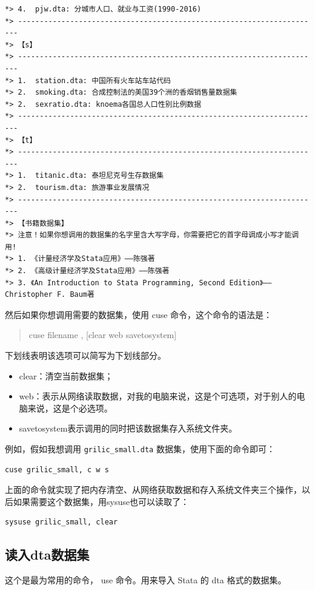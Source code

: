 \begin{lstlisting}
*> 4.  pjw.dta: 分城市人口、就业与工资(1990-2016)
*> ----------------------------------------------------------------------
*> 【s】
*> ----------------------------------------------------------------------
*> 1.  station.dta: 中国所有火车站车站代码
*> 2.  smoking.dta: 合成控制法的美国39个洲的香烟销售量数据集
*> 2.  sexratio.dta: knoema各国总人口性别比例数据
*> ----------------------------------------------------------------------
*> 【t】
*> ----------------------------------------------------------------------
*> 1.  titanic.dta: 泰坦尼克号生存数据集
*> 2.  tourism.dta: 旅游事业发展情况
*> ----------------------------------------------------------------------
*> 【书籍数据集】
*> 注意！如果你想调用的数据集的名字里含大写字母，你需要把它的首字母调成小写才能调用!
*> 1. 《计量经济学及Stata应用》——陈强著
*> 2. 《高级计量经济学及Stata应用》——陈强著
*> 3. 《An Introduction to Stata Programming, Second Edition》——Christopher F. Baum著
\end{lstlisting}

然后如果你想调用需要的数据集，使用 cuse 命令，这个命令的语法是：

\begin{quote}
cuse filename , {[}clear web savetosystem{]}
\end{quote}

下划线表明该选项可以简写为下划线部分。

\begin{itemize}
\item  clear：清空当前数据集；
\item  web：表示从网络读取数据，对我的电脑来说，这是个可选项，对于别人的电脑来说，这是个必选项。
\item  savetosystem表示调用的同时把该数据集存入系统文件夹。
\end{itemize}

例如，假如我想调用 \texttt{grilic\_small.dta} 数据集，使用下面的命令即可：

\begin{lstlisting}
cuse grilic_small, c w s
\end{lstlisting}

上面的命令就实现了把内存清空、从网络获取数据和存入系统文件夹三个操作，以后如果需要这个数据集，用sysuse也可以读取了：

\begin{lstlisting}
sysuse grilic_small, clear
\end{lstlisting}

\subsection{读入dta数据集}
这个是最为常用的命令， use 命令。用来导入 Stata 的 dta 格式的数据集。

